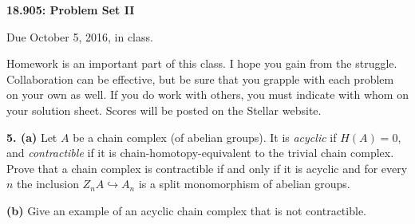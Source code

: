 \documentclass[12pt]{article}
\begin{document}
\thispagestyle{empty}

\def\da#1{\downarrow\rlap{$\vcenter{\hbox{$\scriptstyle#1$}}$}}
\def\ua#1{\uparrow\rlap{$\vcenter{\hbox{$\scriptstyle#1$}}$}}

\def\coker{\mathrm{coker}\,}
\def\im{\mathrm{im}\,}
\def\ker{\mathrm{ker}\,}
\def\NN{\mathbb N}
\def\ZZ{\mathbb Z}
\def\RR{\mathbf R}
\def\Ext{\mathrm{Ext}}
\def\Tor{\mathrm{Tor}}
\def\Hom{\mathrm{Hom}}
\def\Der{\mathrm{Der}}
\def\Map{\mathrm{Map}}
\def\Gp{\mathbf{Gp}}
\def\Mon{\mathbf{Mon}}
\def\mod{\hbox{mod}}
\def\be{\begin{equation}}
\def\ee{\end{equation}}
\def\tensor{\otimes}
\def\iso{\cong}
\def\Ho{\mathrm{Ho}\,}
\def\rin{\mathrm{in}}
\def\la#1{\mathop{\longleftarrow}\limits^{#1}}
\def\ra#1{\mathop{\longrightarrow}\limits^{#1}}
\def\bS{\mathbf{S}}

\def\inj{\mathrm{in}}
\def\pr{\mathrm{pr}}
\def\div{\mathrm{div}}
\def\grad{\mathrm{grad}}
\def\curl{\mathrm{curl}}
\def\Sin{\mathrm{Sin}}

\def\SF{\mathcal{C}^\infty}
\def\VF{\mathcal{VF}^\infty}


\def\TT{\mathbb{T}}
\def\Tensor{\bigotimes}
\def\bDelta{\mathbf{\Delta}}
\def\bSet{\mathbf{Set}}
\def\bAb{\mathbf{Ab}}
\def\bTop{\mathbf{Top}}
\def\bC{\mathbf{C}}
\def\ob{\mathrm{ob}}
\def\bVS{\mathbf{VS}}



\begin{center}
{\bf 18.905: Problem Set II}
\end{center}

Due October 5, 2016, in class. 

Homework is an important part of this class. I hope you gain from the
struggle. Collaboration can be effective, but be sure that you
grapple with each problem on your own as well. If you do work with others,
you must indicate with whom on your solution sheet. Scores will be posted
on the Stellar website.

\bigskip

{\bf 5. (a)} Let $A$ be a chain complex (of abelian groups). 
It is {\em acyclic} if $H(A)=0$, and 
{\em contractible} if it is chain-homotopy-equivalent to the trivial 
chain complex. Prove that a chain complex is contractible if and only
if it is acyclic and for every $n$ the inclusion 
$Z_nA\hookrightarrow A_n$ is a split monomorphism of abelian groups. 

{\bf(b)} Give an example of an acyclic chain complex that is not 
contractible. 
\end{document}
